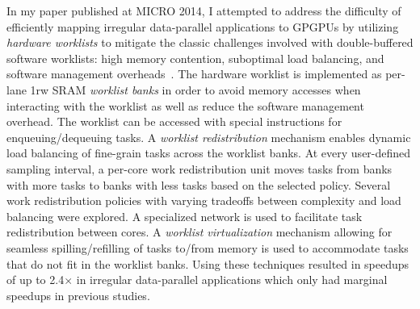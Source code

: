 In my paper published at MICRO 2014, I attempted to address the
difficulty of efficiently mapping irregular data-parallel applications to
GPGPUs by utilizing \emph{hardware worklists} to mitigate the classic
challenges involved with double-buffered software worklists: high memory
contention, suboptimal load balancing, and software management
overheads~\cite{kim-hwwl-micro2014}. The hardware worklist is implemented
as per-lane 1rw SRAM \emph{worklist banks} in order to avoid memory
accesses when interacting with the worklist as well as reduce the
software management overhead. The worklist can be accessed with special
instructions for enqueuing/dequeuing tasks. A \emph{worklist
  redistribution} mechanism enables dynamic load balancing of fine-grain
tasks across the worklist banks. At every user-defined sampling interval,
a per-core work redistribution unit moves tasks from banks with more
tasks to banks with less tasks based on the selected policy. Several work
redistribution policies with varying tradeoffs between complexity and
load balancing were explored. A specialized network is used to facilitate
task redistribution between cores.  A \emph{worklist virtualization}
mechanism allowing for seamless spilling/refilling of tasks to/from
memory is used to accommodate tasks that do not fit in the worklist
banks. Using these techniques resulted in speedups of up to 2.4$\times$
in irregular data-parallel applications which only had marginal speedups
in previous studies.
